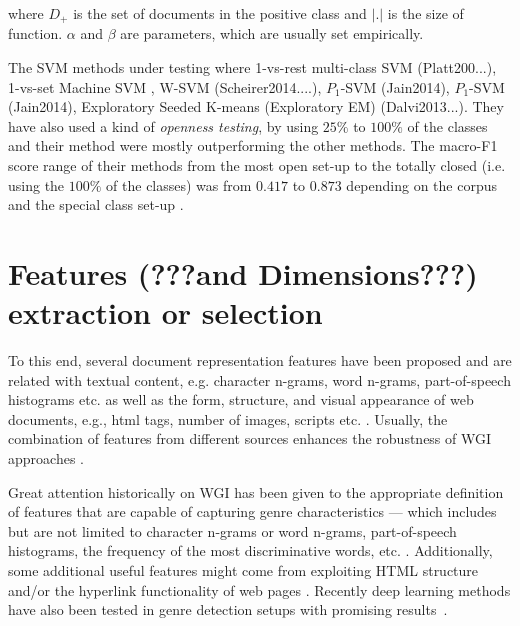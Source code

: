 where $D_{+}$ is the set of documents in the positive class and $\lvert . \rvert$ is the size of function. $\alpha$ and $\beta$ are parameters, which are usually set empirically.

The SVM methods under testing where 1-vs-rest multi-class SVM (Platt200...), 1-vs-set Machine SVM \cite{scheirer2013toward}, W-SVM (Scheirer2014....), $P_{1}$-SVM (Jain2014), $P_{1}$-SVM (Jain2014), Exploratory Seeded K-means (Exploratory EM) (Dalvi2013...). They have also used a kind of \textit{openness testing}, by using $25\%$ to $100\%$ of the classes and their method were mostly outperforming the other methods. The macro-F1 score range of their methods from the most open set-up to the totally closed (i.e. using the $100\%$ of the classes) was from $0.417$ to $0.873$ depending on the corpus and the special class set-up \parencite{fei2016breaking}.

\section{Features (???and Dimensions???) extraction or selection}\label{chap:relevant_work:sec:features}

 To this end, several document representation features have been proposed and are related with textual content, e.g. character n-grams, word n-grams, part-of-speech histograms etc. \parencite{kumari2014web,petrenz2011stable,mason2009n,sharoff2010web} as well as the form, structure, and visual appearance of web documents, e.g., html tags, number of images, scripts etc. \parencite{Lim2005,levering2008using}. Usually, the combination of features from different sources enhances the robustness of WGI approaches \parencite{levering2008using,kanaris2009learning}.

Great attention historically on WGI has been given to the appropriate definition of features that are capable of capturing genre characteristics --- which includes but are not limited to character n-grams or word n-grams, part-of-speech histograms, the frequency of the most discriminative words, etc.  \cite{kanaris2009learning,kumari2014web,levering2008using,Lim2005,mason2009n,onan2018ensemble,petrenz2011stable,sharoff2010web}. Additionally, some additional useful features might come from exploiting HTML structure and/or the hyperlink functionality of web pages \cite{abramson2012_URL,asheghi2014semi,jebari2014pure_URL,priyatam2013don_URL,zhu2011enhance}. Recently deep learning methods have also been tested in genre detection setups with promising results~\cite{worsham2018genre}. 

